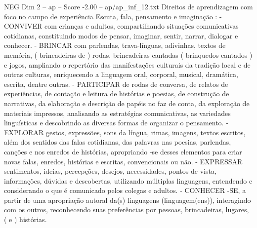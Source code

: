 \begin{textsample}{NEG Dim 2 – ap – Score -2.00 – ap/ap\_inf\_12.txt}
Direitos de aprendizagem com foco no campo de experiência Escuta, fala, pensamento e imaginação : - CONVIVER com crianças e adultos, compartilhando situações comunicativas cotidianas, constituindo modos de pensar, imaginar, sentir, narrar, dialogar e conhecer. - BRINCAR com parlendas, trava-línguas, adivinhas, textos de memória, ( brincadeiras de ) rodas, brincadeiras cantadas ( brinquedos cantados ) e jogos, ampliando o repertório das manifestações culturais da tradição local e de outras culturas, enriquecendo a linguagem oral, corporal, musical, dramática, escrita, dentre outras. - PARTICIPAR de rodas de conversa, de relatos de experiências, de contação e leitura de histórias e poesias, de construção de narrativas, da elaboração e descrição de papéis no faz de conta, da exploração de materiais impressos, analisando as estratégias comunicativas, as variedades linguísticas e descobrindo as diversas formas de organizar o pensamento. - EXPLORAR gestos, expressões, sons da língua, rimas, imagens, textos escritos, além dos sentidos das falas cotidianas, das palavras nas poesias, parlendas, canções e nos enredos de histórias, apropriando -se desses elementos para criar novas falas, enredos, histórias e escritas, convencionais ou não. - EXPRESSAR sentimentos, ideias, percepções, desejos, necessidades, pontos de vista, informações, dúvidas e descobertas, utilizando múltiplas linguagens, entendendo e considerando o que é comunicado pelos colegas e adultos. - CONHECER -SE, a partir de uma apropriação autoral da(s) linguagens (linguagem(ens)), interagindo com os outros, reconhecendo suas preferências por pessoas, brincadeiras, lugares, ( e ) histórias.

\end{textsample}
